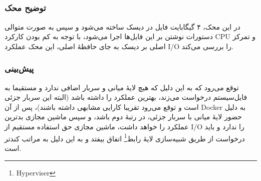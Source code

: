 \subsection{}
\subsubsection{توضیح محک}
در این محک، ۴ گیگابایت فایل در دیسک ساخته می‌شود و سپس به صورت متوالی دستورات نوشتن بر این فایل‌ها
اجرا می‌شود، با توجه به کم بودن کارکرد CPU و تمرکز اصلی بر دیسک به جای حافظهٔ اصلی، این محک عملکرد
I/O را بررسی می‌کند.


\subsubsection{پیش‌بینی}
توقع می‌رود که  به این دلیل که هیچ لایهٔ میانی و سربار اضافی ندارد و مستقیما به فایل‌سیستم درخواست می‌زند،
بهترین عملکرد را داشته باشد (البته این سربار جزئی است و توقع می‌رود تقریبا 
کارایی مشابهی داشته باشند)، پس از آن Docker به دلیل حضور لایهٔ میانی با سربار جزئی، در رتبهٔ دوم باشد،
و سپس ماشین مجازی بدترین عملکرد را خواهد داشت، ماشین مجازی حق استفاده مستقیم از I/O را ندارد و باید درخواست از طریق شبیه‌سازی
لایهٔ رابط\footnote{Hyperviser} اتفاق بیفتد و به این دلیل به مراتب کندتر است.



